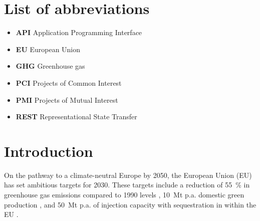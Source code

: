 \documentclass[preprint,12pt]{elsarticle}
\begin{document}


\section*{List of abbreviations}

\begin{itemize}[left=0pt, label={}, itemsep=0pt, parsep=0pt, topsep=0pt]
  \item \textbf{API} \enspace Application Programming Interface
  \item \textbf{EU} \enspace European Union
  \item \textbf{GHG} \enspace Greenhouse gas
  \item \textbf{PCI} \enspace Projects of Common Interest
  \item \textbf{PMI} \enspace Projects of Mutual Interest
  \item \textbf{REST} \enspace Representational State Transfer 
\end{itemize}

\section{Introduction}
\label{sec:introduction}
On the pathway to a climate-neutral Europe by 2050, the European Union (EU) has set ambitious targets for 2030. These targets include a reduction of \SI{55}{\percent} in greenhouse gas emissions compared to 1990 levels \cite{europeancommissionFit55Delivering2021}, \SI{10}{Mt} p.a. domestic green  production \cite{europeancommissionREPowerEUPlanCommunication2022}, and \SI{50}{Mt} p.a. of  injection capacity with sequestration in within the EU \cite{europeanparliamentRegulationEU20242024}.
\end{document}
